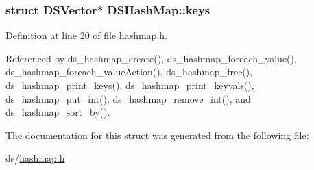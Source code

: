 \subsubsection[{\texorpdfstring{keys}{keys}}]{\setlength{\rightskip}{0pt plus 5cm}struct {\bf D\+S\+Vector}$\ast$ D\+S\+Hash\+Map\+::keys}\hypertarget{structDSHashMap_ac6209316aa09678207cf1389fc2b56e4}{}\label{structDSHashMap_ac6209316aa09678207cf1389fc2b56e4}


Definition at line 20 of file hashmap.\+h.



Referenced by ds\+\_\+hashmap\+\_\+create(), ds\+\_\+hashmap\+\_\+foreach\+\_\+value(), ds\+\_\+hashmap\+\_\+foreach\+\_\+value\+Action(), ds\+\_\+hashmap\+\_\+free(), ds\+\_\+hashmap\+\_\+print\+\_\+keys(), ds\+\_\+hashmap\+\_\+print\+\_\+keyvals(), ds\+\_\+hashmap\+\_\+put\+\_\+int(), ds\+\_\+hashmap\+\_\+remove\+\_\+int(), and ds\+\_\+hashmap\+\_\+sort\+\_\+by().



The documentation for this struct was generated from the following file\+:\begin{DoxyCompactItemize}
\item 
ds/\hyperlink{hashmap_8h}{hashmap.\+h}\end{DoxyCompactItemize}

